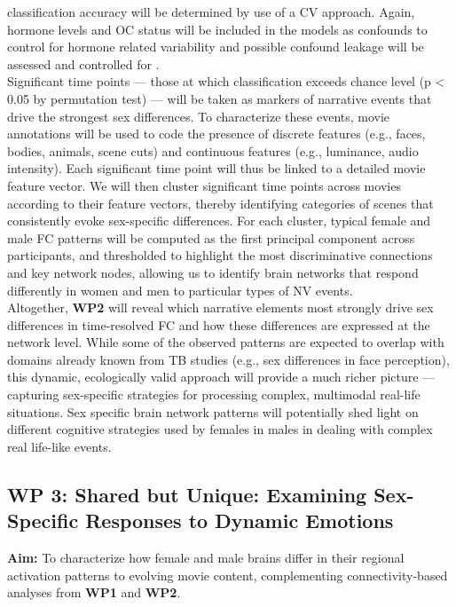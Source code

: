 \documentclass[11pt,a4paper]{article}
\begin{document}
classification accuracy will be determined by use of a CV approach. Again, hormone levels and OC status
will be included in the models as confounds to control for hormone related variability and possible confound
leakage will be assessed and controlled for \parencite{hamdanConfoundleakageConfoundRemoval2022a}.\\
Significant time points — those at which classification exceeds chance level (p < 0.05 by permutation test) — will be 
taken as markers of narrative events that drive the strongest sex differences. 
To characterize these events, movie annotations will be used to code the presence of discrete features 
(e.g., faces, bodies, animals, scene cuts) and continuous features (e.g., luminance, audio intensity). 
Each significant time point will thus be linked to a detailed movie feature vector.  
We will then cluster significant time points across movies according to their feature vectors, 
thereby identifying categories of scenes that consistently evoke sex-specific differences. 
For each cluster, typical female and male FC patterns will be computed as the first principal component 
across participants, and thresholded to highlight the most discriminative connections and key network nodes, allowing us 
to identify brain networks that respond differently in women and men to particular 
types of NV events.\\
Altogether, \textbf{WP2} will reveal which narrative elements most strongly drive sex differences in time-resolved 
FC and how these differences are expressed at the network level. 
While some of the observed patterns are expected to overlap with domains already known from TB studies 
(e.g., sex differences in face perception), this dynamic, ecologically valid approach will provide a 
much richer picture — capturing sex-specific strategies for processing complex, multimodal real-life situations.
Sex specific brain network patterns will potentially shed light on different cognitive strategies used by
females in males in dealing with complex real life-like events.   

\subsection*{WP 3: Shared but Unique: Examining Sex-Specific Responses to Dynamic Emotions}

\textbf{Aim:} To characterize how female and male brains differ in their regional activation patterns 
to evolving movie content, complementing connectivity-based analyses from \textbf{WP1} and \textbf{WP2}.  
\end{document}
